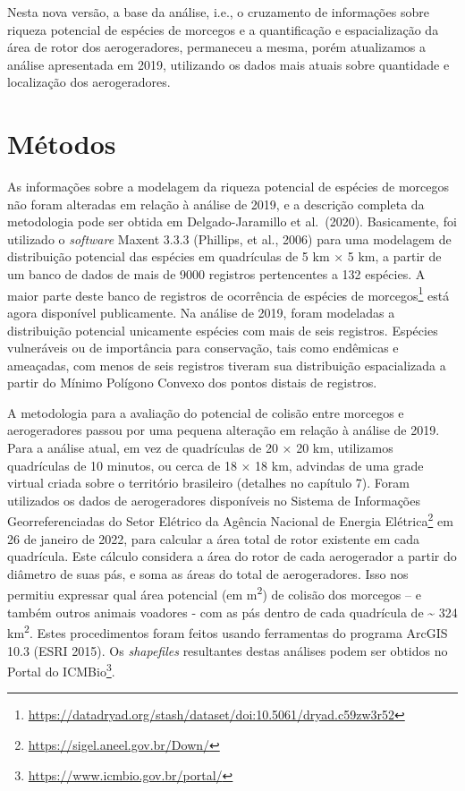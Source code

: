 \documentclass[
  oneside]{scrbook}
\DeclareRobustCommand{\href}[2]{#2\footnote{\url{#1}}}
\begin{document}
Nesta nova versão, a base da análise, i.e., o cruzamento de informações sobre riqueza potencial de espécies de morcegos e a quantificação e espacialização da área de rotor dos aerogeradores, permaneceu a mesma, porém atualizamos a análise apresentada em 2019, utilizando os dados mais atuais sobre quantidade e localização dos aerogeradores.

\hypertarget{muxe9todos}{%
\section{Métodos}\label{muxe9todos}}

As informações sobre a modelagem da riqueza potencial de espécies de morcegos não foram alteradas em relação à análise de 2019, e a descrição completa da metodologia pode ser obtida em Delgado-Jaramillo et al.~(2020). Basicamente, foi utilizado o \emph{software} Maxent 3.3.3 (Phillips, et al., 2006) para uma modelagem de distribuição potencial das espécies em quadrículas de 5 km × 5 km, a partir de um banco de dados de mais de 9000 registros pertencentes a 132 espécies. A maior parte deste \href{https://datadryad.org/stash/dataset/doi:10.5061/dryad.c59zw3r52}{banco de registros de ocorrência de espécies de morcegos} está agora disponível publicamente. Na análise de 2019, foram modeladas a distribuição potencial unicamente espécies com mais de seis registros. Espécies vulneráveis ou de importância para conservação, tais como endêmicas e ameaçadas, com menos de seis registros tiveram sua distribuição espacializada a partir do Mínimo Polígono Convexo dos pontos distais de registros.

A metodologia para a avaliação do potencial de colisão entre morcegos e aerogeradores passou por uma pequena alteração em relação à análise de 2019. Para a análise atual, em vez de quadrículas de 20 × 20 km, utilizamos quadrículas de 10 minutos, ou cerca de 18 × 18 km, advindas de uma grade virtual criada sobre o território brasileiro (detalhes no capítulo 7). Foram utilizados os dados de aerogeradores disponíveis no \href{https://sigel.aneel.gov.br/Down/}{Sistema de Informações Georreferenciadas do Setor Elétrico da Agência Nacional de Energia Elétrica} em 26 de janeiro de 2022, para calcular a área total de rotor existente em cada quadrícula. Este cálculo considera a área do rotor de cada aerogerador a partir do diâmetro de suas pás, e soma as áreas do total de aerogeradores. Isso nos permitiu expressar qual área potencial (em m\textsuperscript{2}) de colisão dos morcegos -- e também outros animais voadores - com as pás dentro de cada quadrícula de \textasciitilde{} 324 km\textsuperscript{2}. Estes procedimentos foram feitos usando ferramentas do programa ArcGIS 10.3 (ESRI 2015). Os \emph{shapefiles} resultantes destas análises podem ser obtidos no \href{https://www.icmbio.gov.br/portal/}{Portal do ICMBio}.
\end{document}
